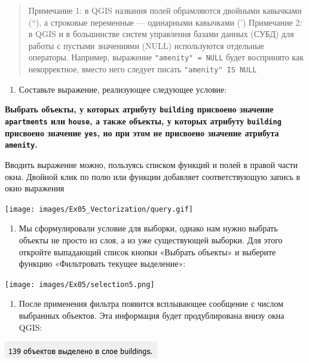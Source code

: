 \documentclass[
  12pt,
]{book}
\providecommand{\tightlist}{%
  \setlength{\itemsep}{0pt}\setlength{\parskip}{0pt}}
\begin{document}
\begin{quote}
Примечание 1: в QGIS названия полей обрамляются двойными кавычками (``), а строковые переменные --- одинарными кавычками (')
Примечание 2: в QGIS и в большинстве систем управления базами данных (СУБД) для работы с пустыми значениями (NULL) используются отдельные операторы. Например, выражение \texttt{"amenity"\ =\ NULL} будет воспринято как некорректное, вместо него следует писать \texttt{"amenity"\ IS\ NULL}
\end{quote}

\begin{enumerate}
\def\labelenumi{\arabic{enumi}.}
\setcounter{enumi}{6}
\tightlist
\item
  Составьте выражение, реализующее следующее условие:
\end{enumerate}

\textbf{Выбрать объекты, у которых атрибуту \texttt{building} присвоено значение \texttt{apartments} или \texttt{house}, а также объекты, у которых атрибуту \texttt{building} присвоено значение \texttt{yes}, но при этом не присвоено значение атрибута \texttt{amenity}.}

Вводить выражение можно, пользуясь списком функций и полей в правой части окна. Двойной клик по полю или функции добавляет соответствующую запись в окно выражения

\texttt{[image: images/Ex05\_Vectorization/query.gif]}

\begin{enumerate}
\def\labelenumi{\arabic{enumi}.}
\setcounter{enumi}{10}
\tightlist
\item
  Мы сформулировали условие для выборки, однако нам нужно выбрать объекты не просто из слоя, а из уже существующей выборки. Для этого откройте выпадающий список кнопки «Выбрать объекты» и выберите функцию «Фильтровать текущее выделение»:
\end{enumerate}

\texttt{[image: images/Ex05/selection5.png]}

\begin{enumerate}
\def\labelenumi{\arabic{enumi}.}
\setcounter{enumi}{11}
\tightlist
\item
  После применения фильтра появится всплывающее сообщение с числом выбранных объектов. Эта информация будет продублирована внизу окна QGIS:
\end{enumerate}

\includegraphics{images/Ex05_Vectorization/select_from_selection.png}
\end{document}
